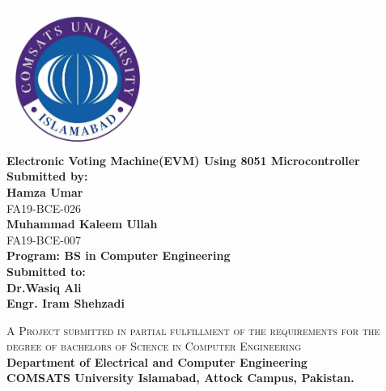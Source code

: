 
\begin{titlepage}
\begin{center}


\includegraphics[width=0.35\textwidth]{./logo}~\\[1.5cm]


{ \huge \bfseries Electronic Voting Machine(EVM) Using 8051 Microcontroller} \\[1.4cm]

{ \large \bfseries Submitted by:} \\[0.2cm]
{ \large \bfseries Hamza Umar}  \\[0.1cm]
{ \small FA19-BCE-026} \\[0.2cm]
{ \large \bfseries Muhammad Kaleem Ullah}  \\[0.1cm]
{ \small FA19-BCE-007} \\[0.2cm]



{ \small \bfseries Program: BS in Computer Engineering} \\[0.2cm]


{ \large \bfseries Submitted to:} \\[0.1cm]
{ \small \bfseries  Dr.Wasiq Ali} \\[0.1cm]
{ \small \bfseries Engr. Iram Shehzadi} \\[0.8cm]

\vfill

\textsc{A Project submitted in partial fulfillment of the requirements for the degree of bachelors of Science in Computer Engineering}\\[1cm]


{ \large \bfseries Department of Electrical and Computer Engineering} \\[0.2cm]
{ \large \bfseries COMSATS University Islamabad, Attock Campus, Pakistan.} \\[0.2cm]



\thispagestyle{empty}
\end{center}
\end{titlepage}

